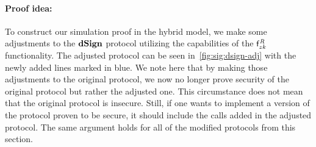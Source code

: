 \paragraph{Proof idea:} To construct our simulation proof in the hybrid model, we make some adjustments to the $\mathbf{dSign}$ protocol utilizing the capabilities of the $\mathsf{f}^{\mathit{R}}_{zk}$ functionality.
The adjusted protocol can be seen in~\cref{fig:sig:dsign-adj} with the newly added lines marked in blue.
We note here that by making those adjustments to the original protocol, we now no longer prove security of the original protocol but rather the adjusted one.
This circumstance does not mean that the original protocol is insecure.
Still, if one wants to implement a version of the protocol proven to be secure, it should include the calls added in the adjusted protocol.
The same argument holds for all of the modified protocols from this section.
